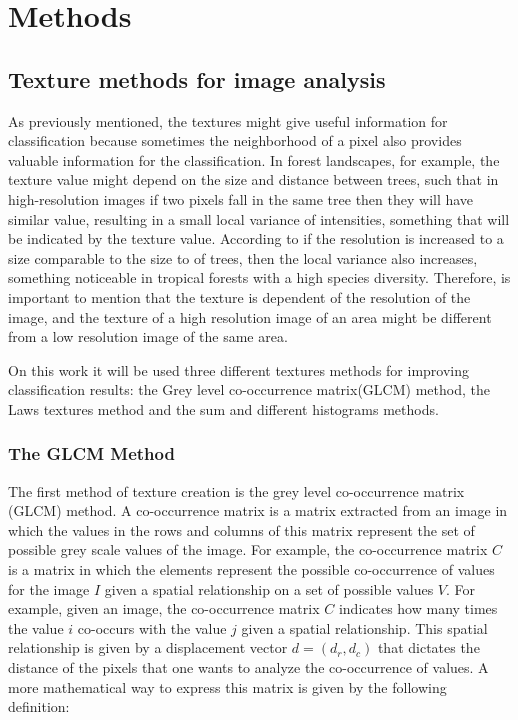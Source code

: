 \section{Methods}
\subsection{Texture methods for image analysis}

As previously mentioned, the textures might give useful information for classification because sometimes the neighborhood of a pixel also provides valuable information for the classification. In forest landscapes, for example, the texture value might depend on the size and distance between trees, such that in high-resolution images if two pixels fall in the same tree then they will have similar value, resulting in a small local variance of intensities, something that will be indicated by the texture value. According to \cite{Woodcock} if the resolution is increased to a size comparable to the size to of trees, then the local variance also increases, something noticeable in tropical forests with a high species diversity. Therefore, is important to mention that the texture is dependent of the resolution of the image, and the texture of a high resolution image of an area might be different from a low resolution image of the same area.

On this work it will be used three different textures methods for improving classification results: the Grey level co-occurrence matrix(GLCM) method, the Laws textures method and the sum and different histograms methods.

\subsubsection{The GLCM Method}
\label{sec:GLCM_Method}

The first method of texture creation is the grey level co-occurrence matrix (GLCM) method.
A co-occurrence matrix is a matrix extracted from an image in which the values in the rows and columns of this matrix represent the set of possible grey scale values of the image. 
For example, the co-occurrence matrix $C$ is a matrix in which the elements represent the possible co-occurrence of values for the image $I$ given a spatial relationship on a set of possible values $V$. 
For example, given an image, the co-occurrence matrix $C$ indicates how many times the value $i$ co-occurs with the value $j$ given a spatial relationship. 
This spatial relationship is given by a displacement vector $d = (d_r, d_c)$ that dictates the distance of the pixels that one wants to analyze the co-occurrence of values.
A more mathematical way to express this matrix is given by the following definition:

